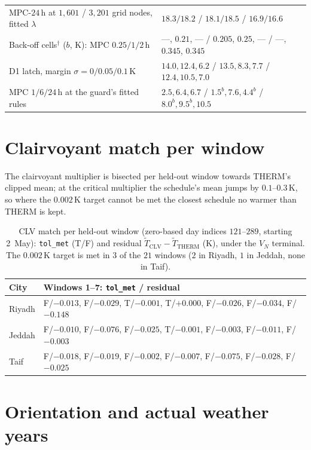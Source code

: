 \documentclass[11pt]{article}
\begin{document}
\begin{table}[!ht]
\begin{tabularx}{\textwidth}{@{}l>{\raggedright\arraybackslash}X@{}}
MPC-$24\,$h at $1{,}601$ / $3{,}201$ grid nodes, fitted $\lambda$ & $18.3/18.2$ / $18.1/18.5$ / $16.9/16.6$ \\
Back-off cells$^\dagger$ ($b$, K): MPC $0.25/1/2\,$h & ---, $0.21$, --- / $0.205$, $0.25$, --- / ---, $0.345$, $0.345$ \\
D1 latch, margin $\sigma=0/0.05/0.1\,$K & $14.0, 12.4, 6.2$ / $13.5, 8.3, 7.7$ / $12.4, 10.5, 7.0$ \\
MPC $1/6/24\,$h at the guard's fitted rules & $2.5, 6.4, 6.7$ / $1.5^{b}, 7.6, 4.4^{b}$ / $8.0^{b}, 9.5^{b}, 10.5$ \\
\bottomrule
\end{tabularx}
\end{table}

\section{Clairvoyant match per window}
\label{sec:s-clv}

The clairvoyant multiplier is bisected per held-out window towards THERM's clipped mean; at the critical multiplier the schedule's mean jumps by $0.1$--$0.3\,$K, so where the $0.002\,$K target cannot be met the closest schedule no warmer than THERM is kept.

\begin{table}[!ht]
\centering
\caption{CLV match per held-out window (zero-based day indices $121$--$289$,
starting 2~May):
\texttt{tol\_met} (T/F) and residual $\tilde T_{\mathrm{CLV}}-\tilde T_{\mathrm{THERM}}$
(K), under the $V_N$ terminal. The $0.002\,$K target is met in $3$ of the
$21$ windows ($2$ in Riyadh, $1$ in Jeddah, none in Taif).}
\label{tab:s-clv}
\small
\begin{tabularx}{\textwidth}{@{}lX@{}}
\toprule
City & Windows 1--7: \texttt{tol\_met} / residual \\
\midrule
Riyadh & F/$-0.013$, F/$-0.029$, T/$-0.001$, T/$+0.000$, F/$-0.026$, F/$-0.034$, F/$-0.148$ \\
Jeddah & F/$-0.010$, F/$-0.076$, F/$-0.025$, T/$-0.001$, F/$-0.003$, F/$-0.011$, F/$-0.003$ \\
Taif & F/$-0.018$, F/$-0.019$, F/$-0.002$, F/$-0.007$, F/$-0.075$, F/$-0.028$, F/$-0.025$ \\
\bottomrule
\end{tabularx}
\end{table}

\section{Orientation and actual weather years}
\label{sec:s-amy}
\end{document}
